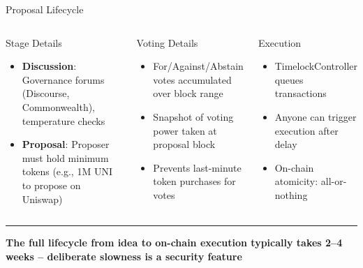\documentclass[8pt,aspectratio=169]{beamer}
\newcommand{\bottomnote}[1]{\vfill\vspace{-2mm}\textcolor{mllavender2}{\rule{\textwidth}{0.4pt}}\vspace{1mm}\footnotesize\textbf{#1}}
\begin{document}
\begin{frame}{Proposal Lifecycle}
\begin{columns}[T]
\begin{block}{\footnotesize Stage Details}
\scriptsize
\begin{itemize}
  \item \textbf{Discussion}: Governance forums (Discourse, Commonwealth), temperature checks
  \item \textbf{Proposal}: Proposer must hold minimum tokens (e.g., 1M UNI to propose on Uniswap)
\end{itemize}
\end{block}
\begin{block}{\footnotesize Voting Details}
\scriptsize
\begin{itemize}
  \item For/Against/Abstain votes accumulated over block range
  \item Snapshot of voting power taken at proposal block
  \item Prevents last-minute token purchases for votes
\end{itemize}
\end{block}
\begin{block}{\footnotesize Execution}
\scriptsize
\begin{itemize}
  \item TimelockController queues transactions
  \item Anyone can trigger execution after delay
  \item On-chain atomicity: all-or-nothing
\end{itemize}
\end{block}
\end{columns}
\bottomnote{The full lifecycle from idea to on-chain execution typically takes 2--4 weeks -- deliberate slowness is a security feature}
\end{frame}
\end{document}

